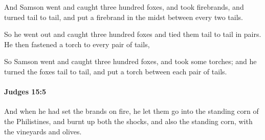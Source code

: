 			\begin{versebox}
					\item[BHS] 
					\item[ASV] And Samson went and caught three hundred foxes, and took firebrands, and turned tail to tail, and put a firebrand in the midst between every two tails.
					\item[NIV] So he went out and caught three hundred foxes and tied them tail to tail in pairs. He then fastened a torch to every pair of tails,
					\item[NRSV] So Samson went and caught three hundred foxes, and took some torches; and he turned the foxes tail to tail, and put a torch between each pair of tails.
			\end{versebox}

		\paragraph{Judges 15:5} %
			\label{JUDGES-15-5}

			And when he had set the brands on fire, he let them go into the standing corn of the Philistines, and burnt up both the shocks, and also the standing corn, with the vineyards and olives.

